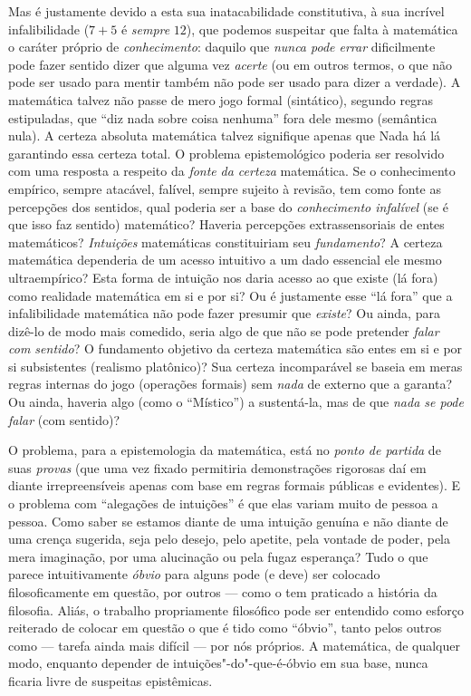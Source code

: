 {Mas é justamente devido a esta sua inatacabilidade
constitutiva, à sua incrível infalibilidade ($7+5$ é
\emph{sempre} $12$), que podemos suspeitar que falta à
matemática o caráter próprio de \emph{conhecimento}: daquilo
que \emph{nunca pode errar} dificilmente pode fazer sentido
dizer que alguma vez \emph{acerte} (ou em outros termos, o que
não pode ser usado para mentir também não pode ser usado para
dizer a verdade). A matemática talvez não passe de mero jogo
formal (sintático), segundo regras estipuladas, que
``diz nada sobre coisa nenhuma''
fora dele mesmo (semântica nula). A certeza absoluta matemática
talvez signifique apenas que Nada há lá garantindo essa certeza
total. O problema epistemológico poderia ser resolvido com uma
resposta a respeito da \emph{fonte} \emph{da certeza}
matemática. Se o conhecimento empírico, sempre atacável,
falível, sempre sujeito à revisão, tem como fonte as percepções
dos sentidos, qual poderia ser a base do \emph{conhecimento
infalível} (se é que isso faz sentido) matemático? Haveria
percepções extrassensoriais de entes matemáticos?
\emph{Intuições} matemáticas constituiriam seu
\emph{fundamento}? A certeza matemática dependeria de um
acesso intuitivo a um dado essencial ele mesmo ultraempírico?
Esta forma de intuição nos daria acesso ao que existe (lá fora)
como realidade matemática em si e por si? Ou é justamente esse
``lá fora'' que a infalibilidade
matemática não pode fazer presumir que \emph{existe}? Ou
ainda, para dizê-lo de modo mais comedido, seria algo de que não
se pode pretender \emph{falar com sentido}? O fundamento
objetivo da certeza matemática são entes em si e por si
subsistentes (realismo platônico)? Sua certeza incomparável se
baseia em meras regras internas do jogo (operações formais) sem
\emph{nada} de externo que a garanta? Ou ainda, haveria algo
(como o ``Místico'') a
sustentá-la, mas de que \emph{nada se pode falar} (com
sentido)?

O problema, para a epistemologia da matemática, está no
\emph{ponto de partida} de suas \emph{provas} (que uma vez
fixado permitiria demonstrações rigorosas daí em diante
irrepreensíveis apenas com base em regras formais públicas e
evidentes). E o problema com ``alegações de
intuições'' é que elas variam muito de pessoa a
pessoa. Como saber se estamos diante de uma intuição genuína e
não diante de uma crença sugerida, seja pelo desejo, pelo
apetite, pela vontade de poder, pela mera imaginação, por uma
alucinação ou pela fugaz esperança? Tudo o que parece
intuitivamente \emph{óbvio} para alguns pode (e deve) ser
colocado filosoficamente em questão, por outros --- como o tem
praticado a história da filosofia. Aliás, o trabalho
propriamente filosófico pode ser entendido como esforço
reiterado de colocar em questão o que é tido como
``óbvio'', tanto pelos outros
como --- tarefa ainda mais difícil --- por nós próprios. A
matemática, de qualquer modo, enquanto depender de
intuições"-do"-que-é-óbvio em sua base, nunca ficaria livre de
suspeitas epistêmicas.

}
